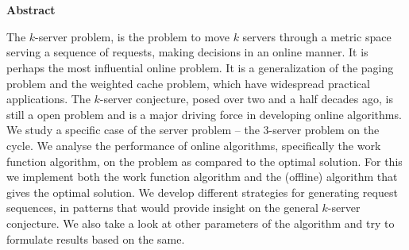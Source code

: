 \tableofcontents

\chapter*{}
\begin{center}
\textbf{Abstract}
\end{center}
The $k$-server problem, is the problem to move $k$ servers through a metric space serving a sequence of requests, making decisions in an online manner. It is perhaps the most influential online problem. It is a generalization of the paging problem and the weighted cache problem, which have widespread practical applications. The $k$-server conjecture, posed over two and a half decades ago, is still a open problem and is a major driving force in developing online algorithms. \\
We study a specific case of the server problem -- the 3-server problem on the cycle. We analyse the performance of online algorithms, specifically the work function algorithm, on the problem as compared to the optimal solution. For this we implement both the work function algorithm and the (offline) algorithm that gives the optimal solution. We develop different strategies for generating request sequences, in patterns that would provide insight on the general $k$-server conjecture. We also take a look at other parameters of the algorithm and try to formulate results based on the same.
